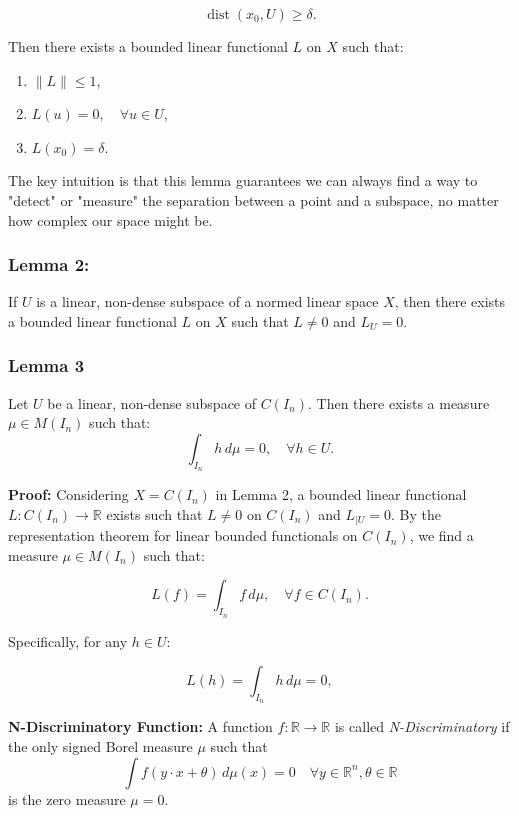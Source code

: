 \[
\operatorname{dist}(x_0, U) \geq \delta.
\]

Then there exists a bounded linear functional \(L\) on \(X\) such that:
\begin{enumerate}[i]
    \item \(\|L\| \leq 1\),
    \item \(L(u) = 0, \quad \forall u \in U\),
    \item \(L(x_0) = \delta\).   \\
\end{enumerate}

The key intuition is that this lemma guarantees we can always find a way to "detect" or "measure" the separation between a point and a subspace, no matter how complex our space might be.

\subsubsection{Lemma 2:} If \(U\) is a linear, non-dense subspace of a normed linear space \(X\), then there exists a bounded linear functional \(L\) on \(X\) such that \(L \neq 0\) and \(L_U = 0\).\\

\subsubsection{Lemma 3 } Let \(U\) be a linear, non-dense subspace of \(C(I_n)\). Then there exists a measure \(\mu \in M(I_n)\) such that:\\

\[
\int_{I_n} h \, d\mu = 0, \quad \forall h \in U.
\]

\textbf{Proof:} Considering \(X = C(I_n)\) in Lemma 2, a bounded linear functional \(L: C(I_n) \rightarrow \mathbb{R}\) exists such that \(L \neq 0\) on \(C(I_n)\) and \(L_{\mid U} = 0\). By the representation theorem for linear bounded functionals on \(C(I_n)\), we find a measure \(\mu \in M(I_n)\) such that:

\[
L(f) = \int_{I_n} f \, d\mu, \quad \forall f \in C(I_n).
\]

Specifically, for any \(h \in U\):

\[
L(h) = \int_{I_n} h \, d\mu = 0,
\]

\textbf{N-Discriminatory Function:} A function \( f: \mathbb{R} \to \mathbb{R} \) is called \textit{N-Discriminatory} if the only signed Borel measure \( \mu \) such that 
\[ \int f(y \cdot x + \theta) \, d\mu(x) = 0 \quad \forall y \in \mathbb{R}^n, \theta \in \mathbb{R} \]
is the zero measure \( \mu = 0 \).

